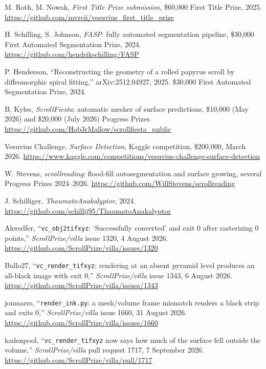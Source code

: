  M. Roth, M. Nowak, \emph{First Title Prize submission}, \$60{,}000 First
  Title Prize, 2025. \url{https://github.com/mvrcii/vesuvius_first_title_prize}

 H. Schilling, S. Johnson, \emph{FASP}: fully automated segmentation pipeline,
  \$30{,}000 First Automated Segmentation Prize, 2024.
  \url{https://github.com/hendrikschilling/FASP}

 P. Henderson, ``Reconstructing the geometry of a rolled papyrus scroll by
  diffeomorphic spiral fitting,'' arXiv:2512.04927, 2025. \$30{,}000 First Automated
  Segmentation Prize, 2024.

 B. Kyles, \emph{ScrollFiesta}: automatic mesher of surface predictions,
  \$10{,}000 (May 2026) and \$20{,}000 (July 2026) Progress Prizes.
  \url{https://github.com/Hob3rMallow/scrollfiesta_public}

 Vesuvius Challenge, \emph{Surface Detection}, Kaggle competition,
  \$200{,}000, March 2026.
  \url{https://www.kaggle.com/competitions/vesuvius-challenge-surface-detection}

 W. Stevens, \emph{scrollreading}: flood-fill autosegmentation and surface
  growing, several Progress Prizes 2024--2026.
  \url{https://github.com/WillStevens/scrollreading}

 J. Schilliger, \emph{ThaumatoAnakalyptor}, 2024.
  \url{https://github.com/schillij95/ThaumatoAnakalyptor}


 Aleredfer, ``\texttt{vc\_obj2tifxyz}: `Successfully converted' and exit 0
  after rasterizing 0 points,'' \emph{ScrollPrize/villa} issue 1320, 4 August 2026.
  \url{https://github.com/ScrollPrize/villa/issues/1320}

 Bullo27, ``\texttt{vc\_render\_tifxyz}: rendering at an absent pyramid level
  produces an all-black image with exit 0,'' \emph{ScrollPrize/villa} issue 1343, 6 August 2026.
  \url{https://github.com/ScrollPrize/villa/issues/1343}

 jonmarrs, ``\texttt{render\_ink.py}: a mesh/volume frame mismatch renders a
  black strip and exits 0,'' \emph{ScrollPrize/villa} issue 1660, 31 August 2026.
  \url{https://github.com/ScrollPrize/villa/issues/1660}

 kadenpool, ``\texttt{vc\_render\_tifxyz} now says how much of the surface fell
  outside the volume,'' \emph{ScrollPrize/villa} pull request 1717, 7 September 2026.
  \url{https://github.com/ScrollPrize/villa/pull/1717}

